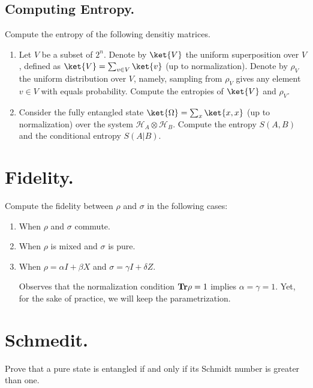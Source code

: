 \documentclass[12pt,a4paper]{article}
\begin{document}
    

\subsection{Computing Entropy.}
Compute the entropy of the following densitiy matrices. 
\begin{enumerate}

  \item Let $V$ be a subset of $2^{n}$. Denote by $\ket{V}$ the uniform superposition over $V$, defined as $\ket{V} = \sum_{v \in V}{\ket{v}}$ (up to normalization). Denote by $\rho_{V}$ the uniform distribution over $V$, namely, sampling from $\rho_{V}$ gives any element $v \in V$ with equals probability. Compute the entropies of $\ket{V}$ and $\rho_{V}$.
    

  \item  Consider the fully entangled state $\ket{\Omega} = \sum_{x}{\ket{x,x}}$ (up to normalization) over the system $\mathcal{H}_{A} \otimes \mathcal{H}_{B}$. Compute the entropy $S(A,B)$ and the conditional entropy $S(A|B)$.
  

\end{enumerate}

\section{Fidelity.}
Compute the fidelity between $\rho$ and $\sigma$ in the following cases: 
\begin{enumerate}
  \item When $\rho$ and $\sigma$ commute. 



  \item When $\rho$ is mixed and $\sigma$ is pure.  


  \item When $\rho = \alpha I + \beta X $ and $\sigma = \gamma I + \delta Z$.
  \begin{remark}
Observes that the normalization condition $\mathbf{Tr} \rho = 1$ implies $\alpha = \gamma = 1$. Yet, for the sake of practice, we will keep the parametrization.
  \end{remark}

\end{enumerate}





\printbibliography 

\section{Schmedit.}
Prove that a pure state is entangled if and only if its Schmidt number is greater than one.
\end{document}
